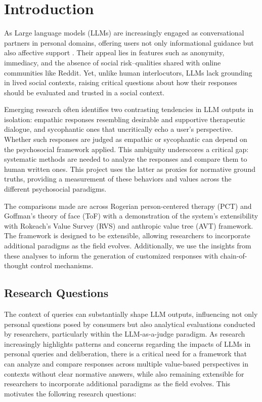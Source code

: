 \section{Introduction}
\textcolor{black!80}{As Large language models (LLMs) are increasingly engaged as conversational partners in personal domains, offering users not only informational guidance but also affective support \cite{zhang-ai_companions, phang-affective, anthropic2025}. Their appeal lies in features such as anonymity, immediacy, and the absence of social risk--qualities shared with online communities like Reddit. Yet, unlike human interlocutors, LLMs lack grounding in lived social contexts, raising critical questions about how their responses should be evaluated and trusted in a social context.}

\textcolor{black!80}{Emerging research often identifies two contrasting tendencies in LLM outputs in isolation: empathic responses resembling desirable and supportive therapeutic dialogue, and sycophantic ones that uncritically echo a user’s perspective. Whether such responses are judged as empathic or sycophantic can depend on the psychosocial framework applied. This ambiguity underscores a critical gap: systematic methods are needed to analyze the responses and compare them to human written ones. This project uses the latter as proxies for normative ground truths, providing a measurement of these behaviors and values across the different psychosocial paradigms.}

\textcolor{black!80}{The comparisons made are across Rogerian person-centered therapy (PCT) and Goffman’s theory of face (ToF) with a demonstration of the system's extensibility with Rokeach’s Value Survey (RVS) and anthropic value tree (AVT) framework. The framework is designed to be extensible, allowing researchers to incorporate additional paradigms as the field evolves. Additionally, we use the insights from these analyses to inform the generation of customized responses with chain-of-thought control mechanisms.}

\subsection{Research Questions}\label{sec:RQs}
The context of queries can substantially shape LLM outputs, influencing not only personal questions posed by consumers but also analytical evaluations conducted by researchers, particularly within the LLM-as-a-judge paradigm. As research increasingly highlights patterns and concerns regarding the impacts of LLMs in personal queries and deliberation, there is a critical need for a framework that can analyze and compare responses across multiple value-based perspectives in contexts without clear normative answers, while also remaining extensible for researchers to incorporate additional paradigms as the field evolves. This motivates the following research questions: 

